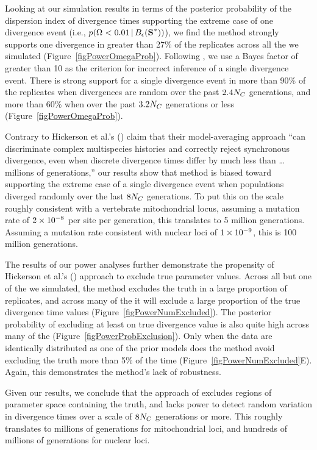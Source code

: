\documentclass[letterpaper,12pt]{article}
\begin{document}
\begin{linenumbers}
Looking at our simulation results in terms of the posterior probability of the
dispersion index of divergence times supporting the extreme case of one
divergence event (i.e., $p(\vmratio{} < 0.01 \given \ssSpace)$), we find the
method strongly supports one divergence in greater than 27\% of the replicates
across all the  we simulated (Figure~\ref{figPowerOmegaProb}).
Following \citet{Hickerson2013}, we use a Bayes factor of greater than 10 as
the criterion for incorrect inference of a single divergence event.
There is strong support for a single divergence event in more than 90\% of the
replicates when divergences are random over the past $2.4N_C$
generations, and more than 60\% when over the past $3.2N_C$
generations or less (Figure~\ref{figPowerOmegaProb}).

Contrary to Hickerson et al.'s (\citeyear{Hickerson2013}) claim that their
model-averaging approach ``can discriminate complex multispecies histories and
correctly reject synchronous divergence, even when discrete divergence times
differ by much less than \ldots millions of generations,'' our results show
that method is biased toward supporting the extreme case of a single
divergence event when populations diverged randomly over the last
$8N_C$ generations.
To put this on the scale roughly consistent with a vertebrate mitochondrial
locus, assuming a mutation rate of $2\times 10^{-8}$ per site per generation, this
translates to 5 million generations.
Assuming a mutation rate consistent with nuclear loci of $1\times 10^{-9}$, this is 100
million generations.

The results of our power analyses further demonstrate the propensity of
Hickerson et al.'s (\citeyear{Hickerson2013}) approach to exclude true
parameter values.
Across all but one of the  we simulated, the method excludes the
truth in a large proportion of replicates, and across many of the  it
will exclude a large proportion of the true divergence time values
(Figure~\ref{figPowerNumExcluded}).
The posterior probability of excluding at least on true divergence value is
also quite high across many of the 
(Figure~\ref{figPowerProbExclusion}).
Only when the data are identically distributed as one of the prior models does
the method avoid excluding the truth more than 5\% of the time
(Figure~\ref{figPowerNumExcluded}E).
Again, this demonstrates the method's lack of robustness.

Given our results, we conclude that the approach of \citet{Hickerson2013}
excludes regions of parameter space containing the truth, and lacks power to
detect random variation in divergence times over a scale of $8N_C$
generations or more.
This roughly translates to millions of generations for mitochondrial loci, and
hundreds of millions of generations for nuclear loci.



\end{linenumbers}
\end{document}
